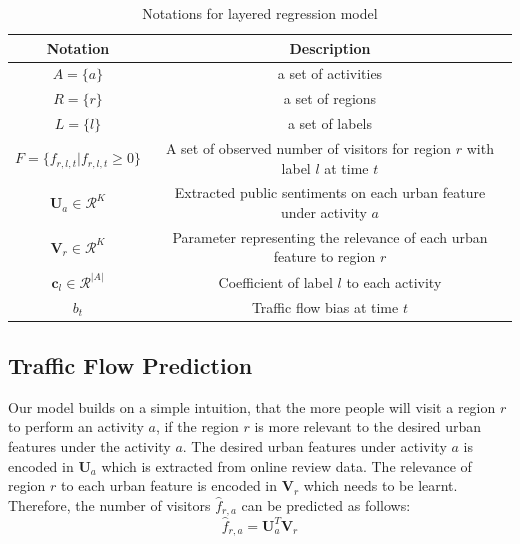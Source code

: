 \documentclass[runningheads]{llncs}
\begin{document}
\begin{table}[htp]
\caption{Notations for layered regression model}
\begin{center}
\begin{tabular}{|c|c|}
\hline
Notation & Description \\\hline
${A}=\{a\}$ & a set of activities \\
${R}=\{r\}$ & a set of regions \\
${L}=\{l\}$ & a set of labels \\
$F=\{f_{r,l,t}|f_{r,l,t}\geq 0\}$ & A set of observed number of visitors for region $r$ with label $l$ at time $t$ \\
$\mathbf{U}_a\in \mathcal{R}^K$ & Extracted public sentiments on each urban feature under activity $a$ \\
$\mathbf{V}_r\in \mathcal{R}^K$ & Parameter representing the relevance of each urban feature to region $r$\\
$\mathbf{c}_{l}\in \mathcal{R}^{|A|}$ & Coefficient of label $l$ to each activity\\
$b_t$ &  Traffic flow bias at time $t$\\ 
\hline
\end{tabular}
\end{center}
\label{tab:notation}
\end{table}%

\subsection{Traffic Flow Prediction}
Our model builds on a simple intuition, that the more people will visit a region $r$ to perform an activity $a$, if the region $r$ is more relevant to the desired urban features under the activity $a$.  
The desired urban features under activity $a$ is encoded in $\mathbf{U}_a$ which is extracted from online review data.
The relevance of region $r$ to each urban feature is encoded in $\mathbf{V}_r$ which needs to be learnt. 
Therefore, the number of visitors $\hat{f}_{r,a}$ can be predicted as follows:
\begin{equation}\label{equ:fra}
\hat{f}_{r,a}= \mathbf{U}_a^T \mathbf{V}_r
\end{equation}
\end{document}
